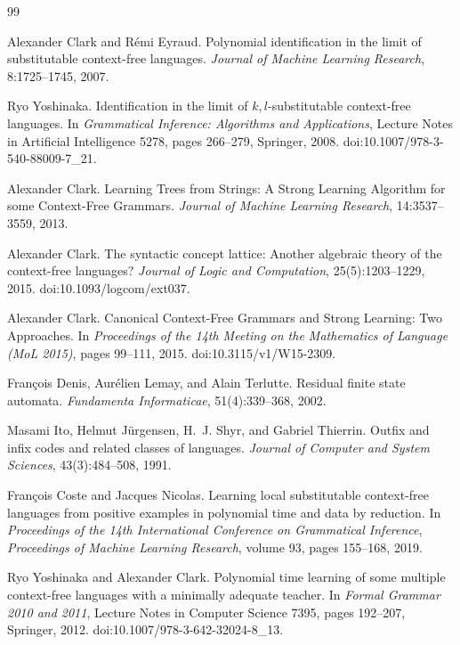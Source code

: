 \documentclass[11pt,a4paper]{article}
\begin{document}
\begin{thebibliography}{99}

Alexander Clark and R\'emi Eyraud.
\newblock Polynomial identification in the limit of substitutable context-free languages.
\newblock \emph{Journal of Machine Learning Research}, 8:1725--1745, 2007.

Ryo Yoshinaka.
\newblock Identification in the limit of $k,l$-substitutable context-free languages.
\newblock In \emph{Grammatical Inference: Algorithms and Applications}, Lecture Notes in Artificial Intelligence 5278, pages 266--279, Springer, 2008.
\newblock doi:10.1007/978-3-540-88009-7\_21.

Alexander Clark.
\newblock Learning Trees from Strings: A Strong Learning Algorithm for some Context-Free Grammars.
\newblock \emph{Journal of Machine Learning Research}, 14:3537--3559, 2013.

Alexander Clark.
\newblock The syntactic concept lattice: Another algebraic theory of the context-free languages?
\newblock \emph{Journal of Logic and Computation}, 25(5):1203--1229, 2015.
\newblock doi:10.1093/logcom/ext037.

Alexander Clark.
\newblock Canonical Context-Free Grammars and Strong Learning: Two Approaches.
\newblock In \emph{Proceedings of the 14th Meeting on the Mathematics of Language (MoL 2015)}, pages 99--111, 2015.
\newblock doi:10.3115/v1/W15-2309.

Fran\c{c}ois Denis, Aur\'elien Lemay, and Alain Terlutte.
\newblock Residual finite state automata.
\newblock \emph{Fundamenta Informaticae}, 51(4):339--368, 2002.

Masami Ito, Helmut J\"urgensen, H.~J. Shyr, and Gabriel Thierrin.
\newblock Outfix and infix codes and related classes of languages.
\newblock \emph{Journal of Computer and System Sciences}, 43(3):484--508, 1991.

Fran\c{c}ois Coste and Jacques Nicolas.
\newblock Learning local substitutable context-free languages from positive examples in polynomial time and data by reduction.
\newblock In \emph{Proceedings of the 14th International Conference on Grammatical Inference},
\newblock \emph{Proceedings of Machine Learning Research}, volume 93, pages 155--168, 2019.

Ryo Yoshinaka and Alexander Clark.
\newblock Polynomial time learning of some multiple context-free languages with a minimally adequate teacher.
\newblock In \emph{Formal Grammar 2010 and 2011}, Lecture Notes in Computer Science 7395, pages 192--207, Springer, 2012.
\newblock doi:10.1007/978-3-642-32024-8\_13.


\end{thebibliography}
\end{document}
